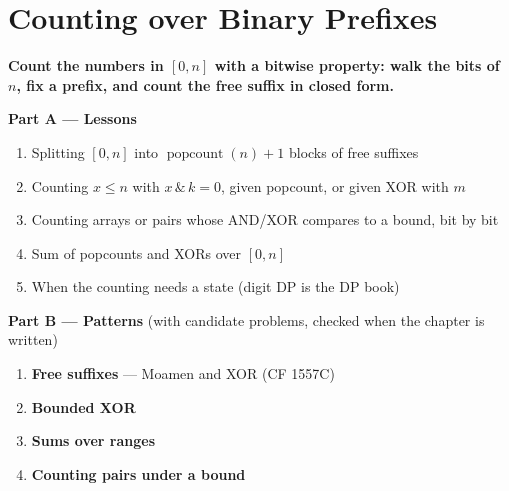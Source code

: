\chapter{Counting over Binary Prefixes}
\label{ch:binary_prefix}

\begin{tcolorbox}[enhanced, colback=white, colframe=secondaryblue, boxrule=1pt, arc=2mm]
\textbf{\large\textcolor{primaryblue}{Count the numbers in $[0, n]$ with a bitwise property: walk the bits of $n$, fix a prefix, and count the free suffix in closed form.}}
\end{tcolorbox}


\begin{plannedbox}
\textbf{Part A --- Lessons}
\begin{enumerate}[leftmargin=*, label=\textbf{A\arabic*.}, itemsep=1pt]
    \item Splitting $[0, n]$ into $\operatorname{popcount}(n)+1$ blocks of free suffixes
    \item Counting $x \le n$ with $x \,\&\, k = 0$, given popcount, or given XOR with $m$
    \item Counting arrays or pairs whose AND/XOR compares to a bound, bit by bit
    \item Sum of popcounts and XORs over $[0, n]$
    \item When the counting needs a state (digit DP is the DP book)
\end{enumerate}
\textbf{Part B --- Patterns} (with candidate problems, checked when the chapter is written)
\begin{enumerate}[leftmargin=*, label=\textbf{P\arabic*.}, itemsep=1pt]
    \item \textbf{Free suffixes} --- Moamen and XOR {\small\color{darkgray}(CF 1557C)}
    \item \textbf{Bounded XOR}
    \item \textbf{Sums over ranges}
    \item \textbf{Counting pairs under a bound}
\end{enumerate}
\end{plannedbox}
